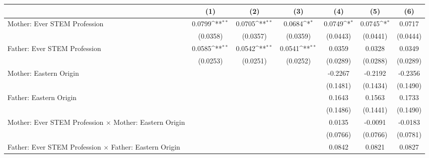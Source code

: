 {
\def\sym#1{\ifmmode^{#1}\else\(^{#1}\)\fi}
\begin{tabular}{l*{6}{c}}
\toprule
                    &\multicolumn{1}{c}{(1)}         &\multicolumn{1}{c}{(2)}         &\multicolumn{1}{c}{(3)}         &\multicolumn{1}{c}{(4)}         &\multicolumn{1}{c}{(5)}         &\multicolumn{1}{c}{(6)}         \\
\midrule
Mother: Ever STEM Profession&      0.0799\sym{**} &      0.0705\sym{**} &      0.0684\sym{*}  &      0.0749\sym{*}  &      0.0745\sym{*}  &      0.0717         \\
                    &    (0.0358)         &    (0.0357)         &    (0.0359)         &    (0.0443)         &    (0.0441)         &    (0.0444)         \\
\addlinespace
Father: Ever STEM Profession&      0.0585\sym{**} &      0.0542\sym{**} &      0.0541\sym{**} &      0.0359         &      0.0328         &      0.0349         \\
                    &    (0.0253)         &    (0.0251)         &    (0.0252)         &    (0.0289)         &    (0.0288)         &    (0.0289)         \\
\addlinespace
Mother: Eastern Origin&                     &                     &                     &     -0.2267         &     -0.2192         &     -0.2356         \\
                    &                     &                     &                     &    (0.1481)         &    (0.1434)         &    (0.1490)         \\
\addlinespace
Father: Eastern Origin&                     &                     &                     &      0.1643         &      0.1563         &      0.1733         \\
                    &                     &                     &                     &    (0.1486)         &    (0.1441)         &    (0.1490)         \\
\addlinespace
Mother: Ever STEM Profession $\times$ Mother: Eastern Origin&                     &                     &                     &      0.0135         &     -0.0091         &     -0.0183         \\
                    &                     &                     &                     &    (0.0766)         &    (0.0766)         &    (0.0781)         \\
\addlinespace
Father: Ever STEM Profession $\times$ Father: Eastern Origin&                     &                     &                     &      0.0842         &      0.0821         &      0.0827         \\

\end{tabular}}
